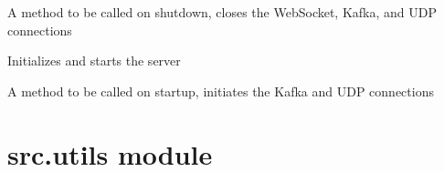 \documentclass[letterpaper,10pt,english]{sphinxmanual}
\begin{document}
\begin{fulllineitems}
\label{\detokenize{src:src.server.cleanup_background_tasks}}
A method to be called on shutdown, closes the WebSocket, Kafka, and UDP connections

\end{fulllineitems}


\begin{fulllineitems}
\label{\detokenize{src:src.server.init_app}}
Initializes and starts the server

\end{fulllineitems}


\begin{fulllineitems}
\label{\detokenize{src:src.server.start_background_tasks}}
A method to be called on startup, initiates the Kafka and UDP connections

\end{fulllineitems}



\section{src.utils module}
\label{\detokenize{src:module-src.utils}}\label{\detokenize{src:src-utils-module}}
\end{document}

